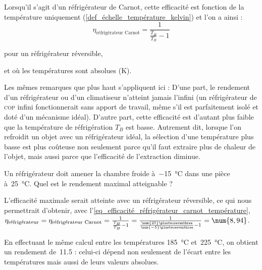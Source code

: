 		Lorsqu’il s’agit d’un réfrigérateur de Carnot, cette efficacité est fonction de la température uniquement (\ref{def_échelle_température_kelvin}) et l’on a ainsi :
		\begin{equation}
			\eta_\text{réfrigérateur Carnot} = \frac{1}{\frac{T_H}{T_B} - 1}
			\label{eq_efficacité_réfrigérateur_carnot_température}
		\end{equation}
		\begin{equationterms}
			\item pour un réfrigérateur réversible,
			\item et où les températures sont absolues (\si{\kelvin}).
		\end{equationterms}

		Les mêmes remarques que plus haut s’appliquent ici : D’une part, le rendement d’un réfrigérateur ou d’un climatiseur n’atteint jamais l’infini (un réfrigérateur de \textsc{cop} infini fonctionnerait sans apport de travail, même s’il est parfaitement isolé et doté d’un mécanisme idéal). D’autre part, cette efficacité est d’autant plus faible que la température de réfrigération $T_B$ est basse. Autrement dit, lorsque l’on refroidit un objet avec un réfrigérateur idéal, la sélection d’une température plus basse est plus coûteuse non seulement parce qu’il faut extraire plus de chaleur de l’objet, mais aussi parce que l’efficacité de l’extraction diminue.
		
		 \begin{anexample}
		 \label{ex_efficacite_refrigerateur_carnot}
		 	Un réfrigérateur doit amener la chambre froide à~\SI{-15}{\degreeCelsius} dans une pièce à~\SI{25}{\degreeCelsius}. Quel est le rendement maximal atteignable ?
		 		\begin{answer}
		 			L’efficacité maximale serait atteinte avec un réfrigérateur réversible, ce qui nous permettrait d’obtenir, avec l’\cref{eq_efficacité_réfrigérateur_carnot_température}, $\eta_\text{réfrigérateur} = \eta_\text{réfrigérateur Carnot} = \frac{1}{\frac{T_H}{T_B} - 1} = \frac{1}{\frac{\num{25}\plustwoseventhree}{\num{-5}\plustwoseventhree} - 1} = \num{8,94}$.
		 		\end{answer}
		 			\begin{remark}En effectuant le même calcul entre les températures \SI{185}{\degreeCelsius} et~\SI{225}{\degreeCelsius}, on obtient un rendement de~\num{11,5} : celui-ci dépend non seulement de l’écart entre les températures mais aussi de leurs valeurs absolues.\end{remark}
		 \end{anexample}


